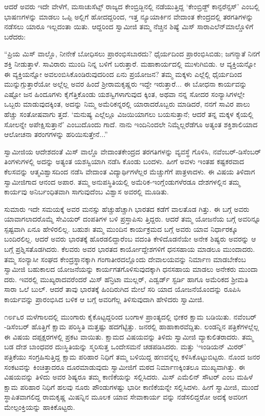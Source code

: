 ಆದರೆ ಅವರು ಇದೇ ವೇಳೆಗೆ, ಮಸಾಚುಸೆಟ್ಸ್ ರಾಜ್ಯದ ಕೇಂಬ್ರಿಡ್ಜಿನಲ್ಲಿ ನಡೆಯುತ್ತಿದ್ದ ‘ಕೇಂಬ್ರಿಡ್ಜ್ ಕಾನ್ಫರೆನ್ಸಸ್​’ ಎಂಬಲ್ಲಿ ಭಾಷಣಗಳನ್ನು ಮಾಡಲು ಒಪ್ಪಿ ಅಲ್ಲಿಗೆ ಹೋದದ್ದರಿಂದ, ಇತ್ತ ನ್ಯೂಯಾರ್ಕಿನ ವೇದಾಂತ ಕೇಂದ್ರದಲ್ಲಿ ತರಗತಿಗಳನ್ನು ನಡೆಸಲು ಯಾರೂ ಇಲ್ಲದಂತಾ ಯಿತು. ಆದ್ದರಿಂದ ಸ್ವಾಮೀಜಿ ತಮ್ಮ ನೆಚ್ಚಿನ ಶಿಷ್ಯೆ ಮಿಸ್ ಸಾರಾಎಲೆನ್​ಮಾಲ್ಡೊಳಿಗೆ ಬರೆದರು:

“ಪ್ರಿಯ ಮಿಸ್ ವಾಲ್ಡೊ, ನೀನೇಕೆ ಬೋಧಿಸಲು ಪ್ರಾರಂಭಿಸಬಾರದು? ಧೈರ್ಯದಿಂದ ಪ್ರಾರಂಭಿಸಿಬಿಡು; ಜಗನ್ಮಾತೆ ನಿನಗೆ ಶಕ್ತಿ ನೀಡುತ್ತಾಳೆ. ಸಾವಿರಾರು ಮುಂದಿ ನಿನ್ನ ಬಳಿಗೆ ಬರುತ್ತಾರೆ. ಮಹಾಕಾರ್ಯದಲ್ಲಿ ಮುಳುಗಿಬಿಡು. ಆ ವ್ಯಕ್ತಿಯನ್ನೋ ಈ ವ್ಯಕ್ತಿಯನ್ನೋ ಅವಲಂಬಿಸಿಕೊಂಡಿರುವುದರಿಂದ ಏನು ಪ್ರಯೋಜನ? ತಮ್ಮ ಮಕ್ಕಳು ಎಲ್ಲೆಲ್ಲಿ ಧೈರ್ಯದಿಂದ ಮುನ್ನುಗ್ಗುತ್ತಾರೆಯೋ ಅಲ್ಲೆಲ್ಲ ಅವರ ಹಿಂದೆ ಶ್ರೀರಾಮಕೃಷ್ಣರು ಇದ್ದೇ ಇರುತ್ತಾರೆ... ಈ ಬೋಧನಾ ಕಾರ್ಯವನ್ನು ಎಷ್ಟೋ ಜನ ಹಿಂದೂಗಳು ಕೈಗೆತ್ತಿಕೊಂಡು ಯಶಸ್ವಿಗಳಾಗುವುದ ಕ್ಕಿಂತ, ಅಥವಾ ನನ್ನ ಸೋದರ ಸಂನ್ಯಾಸಿಗಳಲ್ಲೇ ಒಬ್ಬರು ಮಾಡುವುದಕ್ಕಿಂತ, ಅದನ್ನು ನಿಮ್ಮ ಅಮೆರಿಕನ್ನರಲ್ಲಿ ಯಾರಾದರೊಬ್ಬರು ಮಾಡಿದರೆ, ನನಗೆ ಸಾವಿರ ಪಾಲು ಹೆಚ್ಚು ಸಂತೋಷವಾಗು ತ್ತದೆ. ‘ಮನುಷ್ಯ ಎಲ್ಲೆಲ್ಲೂ ವಿಜಯಿಯಾಗಲು ಬಯಸುತ್ತಾನೆ; ಆದರೆ ತನ್ನ ಮಕ್ಕಳ ಕೈಯಲ್ಲಿ ಸೋಲನ್ನೇ ಅಪೇಕ್ಷಿಸುತ್ತಾನೆ’ ಎಂಬುದೊಂದು ಗಾದೆ. ನಾನು ಇಂದಿನಿಂದಲೇ ನಿಮ್ಮೆಲ್ಲರೆಡೆಗೂ ಅತ್ಯಂತ ಶಕ್ತಿಶಾಲಿಯಾದ ಆಲೋಚನಾ ತರಂಗಗಳನ್ನು ಹರಿಯಿಸುತ್ತೇನೆ...”

ಸ್ವಾಮೀಜಿಯ ಆದೇಶದಂತೆ ಮಿಸ್ ವಾಲ್ಡೊ ವೇದಾಂತಕೇಂದ್ರದ ತರಗತಿಗಳನ್ನು ವ್ಯವಸ್ಥೆ ಗೊಳಿಸಿ, ನವೆಂಬರ್​-ಡಿಸೆಂಬರ್ ತಿಂಗಳುಗಳಲ್ಲಿ ಅದನ್ನು ಅತ್ಯಂತ ಯಶಸ್ವಿಯಾಗಿ ನಡೆಸಿ ಕೊಂಡು ಬಂದಳು. ಹೀಗೆ ಅವಳು ಇಂತಹ ಕಷ್ಟಕರವಾದ ಕೆಲಸವನ್ನು ಆತ್ಮವಿಶ್ವಾಸದಿಂದ ನಡೆಸಿ ವೇದಾಂತ ವಿದ್ಯಾರ್ಥಿಗಳೆಲ್ಲರ ಮೆಚ್ಚುಗೆಗೆ ಪಾತ್ರಳಾದಳು. ಈ ವಿಷಯ ತಿಳಿದಾಗ ಸ್ವಾಮೀಜಿಗಾದ ಆನಂದ ಅಪಾರ. ತಮ್ಮ ಅನುಪಸ್ಥಿತಿಯಲ್ಲಿ ಅಮೆರಿಕ-ಇಂಗ್ಲೆಂಡುಗಳೆರಡೂ ದೇಶಗಳಲ್ಲಿನ ತಮ್ಮ ಕಾರ್ಯವು ಅನಿರ್ಬಂಧಿತವಾಗಿ ಸಾಗುವುದೆಂಬ ವಿಶ್ವಾಸ ಅವರಲ್ಲಿ ಮೂಡಿತು.

ಸುಮಾರು ಇದೇ ಸಮಯಕ್ಕೆ ಅವರ ಮನಸ್ಸು ಹೆಚ್ಚುಹೆಚ್ಚಾಗಿ ಭಾರತದ ಕಡೆಗೆ ವಾಲತೊಡ ಗಿತ್ತು. ಈ ಬಗ್ಗೆ ಅವರು ಯಾವಾಗಲಾದರೊಮ್ಮೆ ಸೇವಿಯರ್ ದಂಪತಿಗಳ ಬಳಿ ಪ್ರಸ್ತಾಪಿಸು ತ್ತಿದ್ದರು. ಆದರೆ ತಮ್ಮ ಯೋಜನೆಯ ಬಗ್ಗೆ ಅವರಿನ್ನೂ ಸ್ಪಷ್ಟವಾಗಿ ಏನೂ ಹೇಳಿರಲಿಲ್ಲ. ಬಹುಶಃ ತಮ್ಮ ಮುಂದಿನ ಕಾರ್ಯಕ್ರಮದ ಬಗ್ಗೆ ಅವರು ಯಾವ ನಿರ್ಧಾರಕ್ಕೂ ಬಂದಿರಲಿಲ್ಲ. ಆದರೆ ಅವರು ಭಾರತಕ್ಕೆ ಹೊರಡಲಿದ್ದಾರೆಂಬ ವದಂತಿ ಕೇಳಿದೊಡನೆಯೇ ಅನೇಕ ಶಿಷ್ಯರು ಅವರನ್ನು ಆ ಬಗ್ಗೆ ಪ್ರಶ್ನಿಸತೊಡಗಿದರು. ಕೆಲವರು ಅವರ ಭಾರತದ ಕಾರ್ಯೋದ್ದೇಶಗಳಿಗೆ ಧನಸಹಾಯ ಮಾಡಲೂ ಮುಂದಾದರು. ತಮ್ಮ ಸಂನ್ಯಾಸೀ ಸಂಘದ ಕೇಂದ್ರಸ್ಥಾನಕ್ಕಾಗಿ ಗಂಗಾತೀರದಲ್ಲೊಂದು ದೇವಾಲಯವನ್ನು ನಿರ್ಮಾಣ ಮಾಡಬೇಕೆಂಬ ಸ್ವಾಮೀಜಿ ಬಹುಕಾಲದ ಯೋಜನೆಯನ್ನು ಕಾರ್ಯಗತಗೊಳಿಸುವುದಕ್ಕಾಗಿ ಧನಸಹಾಯ ಮಾಡಲು ಅನೇಕರು ಮುಂದಾ ದರು. ಇವರಲ್ಲಿ ಮುಖ್ಯರಾದವರೆಂದರೆ ಮಿಸ್ ಹೆನ್ರಿಟಾ ಮುಲ್ಲರ್, ಎಡ್ವರ್ಡ್ ಸ್ಟರ್ಡಿ ಹಾಗೂ ಅಮೆರಿಕದ ಶ್ರೀಮತಿ ಸಾರಾ ಒಲೆ ಬುಲ್. ಆದರೆ ತಾವು ಭಾರತಕ್ಕೆ ಹಿಂದಿರುಗಿದ ಮೇಲೆ ಸರಿ ಯಾದ ಯೋಜನೆಯೊಂದನ್ನು ರೂಪಿಸಿ ಕಾರ್ಯವನ್ನು ಪ್ರಾರಂಭಿಸಿದ ಬಳಿಕ ಆ ಬಗ್ಗೆ ಅವರಿಗೆಲ್ಲ ತಿಳಿಸುವುದಾಗಿ ಹೇಳಿದರು ಸ್ವಾಮೀಜಿ.

೧೮೯೬ರ ಮಳೆಗಾಲದಲ್ಲಿ ಮುಂಗಾರು ಕೈಕೊಟ್ಟದ್ದರಿಂದ ಬಂಗಾಳ ಪ್ರಾಂತ್ಯದಲ್ಲಿ ಭೀಕರ ಕ್ಷಾಮ ಬಡಿಯಿತು. ನವೆಂಬರ್​-ಡಿಸೆಂಬರ್ ಹೊತ್ತಿಗೆ ಕ್ಷಾಮ ಪರಿಸ್ಥಿತಿ ಮತ್ತಷ್ಟು ಹದಗೆಟ್ಟಿತ್ತು. ಜನರಲ್ಲಿ ಹಾಹಾಕಾರವೆದ್ದಿತು. ಲಂಡನ್ನಿನ ಪತ್ರಿಕೆಗಳಲ್ಲೆಲ್ಲ ಈ ವಿಷಯ ದಪ್ಪಕ್ಷರಗಳಲ್ಲಿ ಪ್ರಕಟ ವಾಯಿತು. ಕ್ಷಾಮದ ವಿಷಯವನ್ನು ತಿಳಿದು ಸ್ವಾಮೀಜಿ ವ್ಯಾಕುಲಿತರಾದರು. ತಮ್ಮ ಬಡ ದೇಶ ಬಾಂಧವರ ದುಃಸ್ಥಿತಿಯನ್ನು ಸ್ಮರಿಸುತ್ತ ಒಂದೇಸಮನೆ ಚಡಪಡಿಸಿದರು. ಮತ್ತು ‘ಇಂಡಿಯನ್ ಮಿರರ್​’ ಪತ್ರಿಕೆಯು ಸಂಗ್ರಹಿಸುತ್ತಿದ್ದ ಕ್ಷಾಮ ಪರಿಹಾರ ನಿಧಿಗೆ ತಮ್ಮ ಬಳಿಯಿದ್ದ ಹಣವನ್ನೆಲ್ಲ ಕಳಿಸಿಕೊಟ್ಟುಬಿಟ್ಟರು. ನೊಂದ ಜನರ ಸಂಕಟವನ್ನು ಕಿಂಚಿತ್ತಾದರೂ ದೂರಮಾಡುವುದು ಸ್ವಾಮೀಜಿಗೆ ಮಠದ ನಿರ್ಮಾಣಕ್ಕಿಂತಲೂ ಮುಖ್ಯವಾಗಿತ್ತು. ಈ ವಿಷಯವನ್ನು ತಿಳಿದು ಅವರ ಶಿಷ್ಯರೂ ತಮ್ಮ ಕಾಣಿಕೆಯನ್ನು ಸಲ್ಲಿಸಿದರು. ಮಿಸ್ ಎಮೆಲಿನ್ ಸೌಟರ್ ಎಂಬ ಮಹಿಳೆ ಕ್ಷಾಮ ಪರಿಹಾರ ನಿಧಿಗೆ ಹಲವು ನೂರು ಪೌಂಡುಗಳಷ್ಟು ಭಾರೀ ಕಾಣಿಕೆಯನ್ನೇ ಸಲ್ಲಿಸಿದಳು. ಹೀಗೆ ಸ್ವಾಮೀಜಿ, ಮುಂದೆ ಸ್ಥಾಪಿತವಾಗಲಿದ್ದ ರಾಮಕೃಷ್ಣ ಮಿಷನ್ನಿನ ಮೂಲಕ ಯಾವ ಸೇವಾಕಾರ್ಯ ವನ್ನು ನಡೆಸಲಿದ್ದರೋ ಅದಕ್ಕೆ ಅವರೀಗ ಮೇಲ್ಪಂಕ್ತಿಯನ್ನು ಹಾಕಿಕೊಟ್ಟರು.

